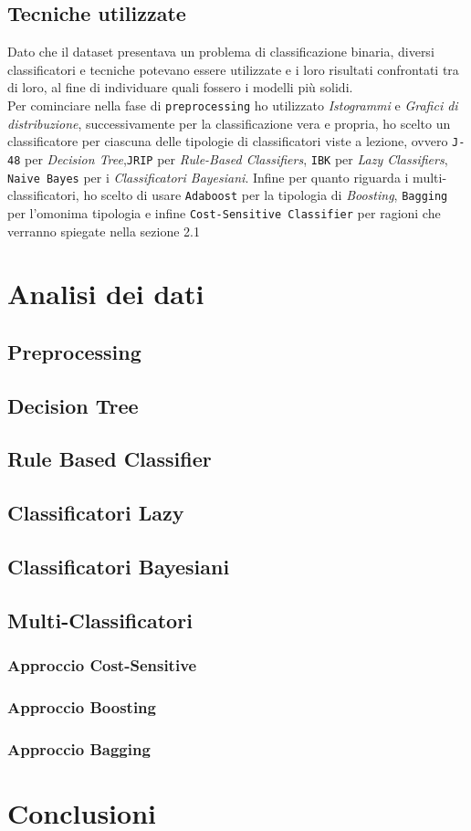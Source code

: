   \subsection{Tecniche utilizzate}
  Dato che il dataset presentava un problema di classificazione binaria, diversi classificatori e tecniche potevano essere utilizzate e i loro risultati confrontati tra di loro, al fine di individuare quali fossero i modelli più solidi.\\
  Per cominciare nella fase di \texttt{preprocessing} ho utilizzato \textit{Istogrammi} e \textit{Grafici di distribuzione}, successivamente per la classificazione vera e propria, ho scelto un classificatore per ciascuna delle tipologie di classificatori viste a lezione, ovvero \texttt{J-48} per \textit{Decision Tree},\texttt{JRIP} per \textit{Rule-Based Classifiers}, \texttt{IBK} per \textit{Lazy Classifiers}, \texttt{Naive Bayes} per i \textit{Classificatori Bayesiani}.
  Infine per quanto riguarda i multi-classificatori, ho scelto di usare \texttt{Adaboost} per la tipologia di \textit{Boosting}, \texttt{Bagging} per l'omonima tipologia e infine \texttt{Cost-Sensitive Classifier} per ragioni che verranno spiegate nella sezione 2.1
  \section{Analisi dei dati}
  \subsection{Preprocessing}
  \subsection{Decision Tree}
  \subsection{Rule Based Classifier}
  \subsection{Classificatori Lazy}
  \subsection{Classificatori Bayesiani}
  \subsection{Multi-Classificatori}
  \subsubsection{Approccio Cost-Sensitive}
  \subsubsection{Approccio Boosting}
  \subsubsection{Approccio Bagging}
  \section{Conclusioni}
  

